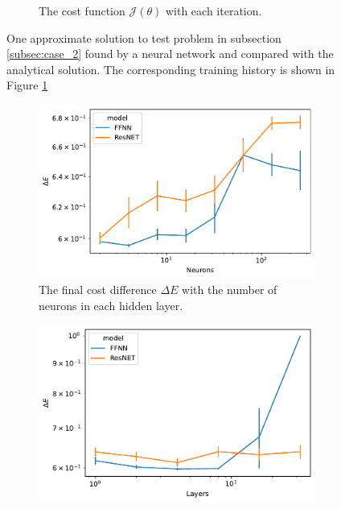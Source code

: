 \begin{figure}[b]
\begin{subfigure}[t]{0.5\textwidth}
        \caption{The cost function \(\mathcal{J}(\theta)\) with each iteration.}\label{fig:curve_2_history}
    \end{subfigure}
    \caption{One approximate solution to test problem in subsection \ref{subsec:case_2} found by a neural network and compared with the analytical solution. The corresponding training history is shown in Figure \ref{fig:curve_2_history} }\label{fig:curve_2_example}
\end{figure}

\begin{figure}[b]
    \begin{subfigure}[t]{0.5\textwidth}
        \centering
        \includegraphics[width=\linewidth]{figures/curve_2/exp_3/neurons_error.pdf}
        \caption{The final cost difference \(\Delta E\) with the number of neurons in each hidden layer.} \label{fig:curve_2_neuron_error}
    \end{subfigure}
    \begin{subfigure}[t]{0.5\textwidth}
        \centering
        \includegraphics[width=\linewidth]{figures/curve_2/exp_3/layer_error.pdf}

\end{subfigure}
\end{figure}
